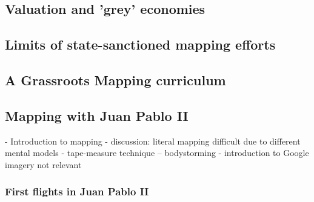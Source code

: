 \documentclass[11pt]{report}
\begin{document}

\subsection{Valuation and 'grey' economies}


\subsection{Limits of state-sanctioned mapping efforts}


\subsection{A Grassroots Mapping curriculum}


\subsection{Mapping with Juan Pablo II}

                - Introduction to mapping
                    - discussion: literal mapping difficult due to different mental models
                    - tape-measure technique -- bodystorming
                    - introduction to Google imagery not relevant
\subsubsection{First flights in Juan Pablo II}

\end{document}
